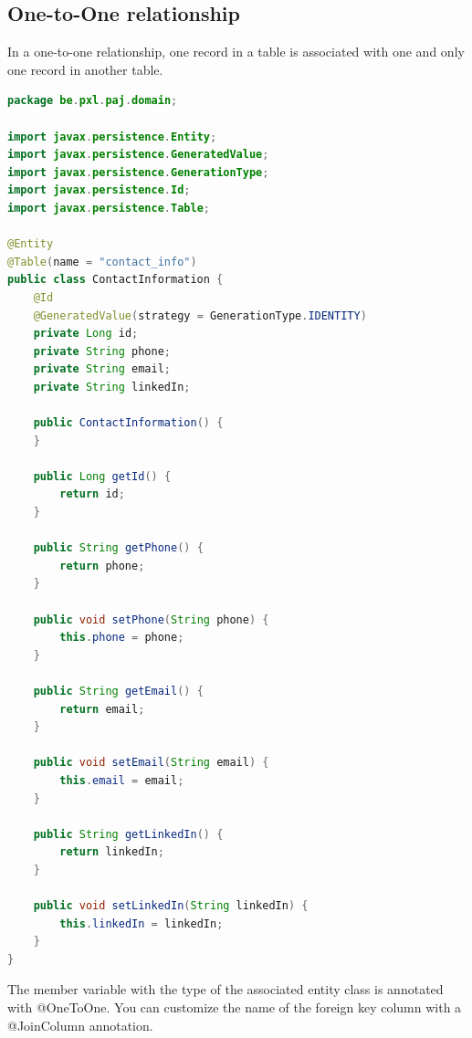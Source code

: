 \subsection{One-to-One relationship}

In a one-to-one relationship, one record in a table is associated with one and only one record in another table.

\begin{lstlisting}[frame=single, language=java]
package be.pxl.paj.domain;

import javax.persistence.Entity;
import javax.persistence.GeneratedValue;
import javax.persistence.GenerationType;
import javax.persistence.Id;
import javax.persistence.Table;

@Entity
@Table(name = "contact_info")
public class ContactInformation {
	@Id
	@GeneratedValue(strategy = GenerationType.IDENTITY)
	private Long id;
	private String phone;
	private String email;
	private String linkedIn;

	public ContactInformation() {
	}

	public Long getId() {
		return id;
	}

	public String getPhone() {
		return phone;
	}

	public void setPhone(String phone) {
		this.phone = phone;
	}

	public String getEmail() {
		return email;
	}

	public void setEmail(String email) {
		this.email = email;
	}

	public String getLinkedIn() {
		return linkedIn;
	}

	public void setLinkedIn(String linkedIn) {
		this.linkedIn = linkedIn;
	}
}
\end{lstlisting}

The member variable with the type of the associated entity class is annotated with @OneToOne. You can customize the name of the foreign key column with a @JoinColumn annotation.

